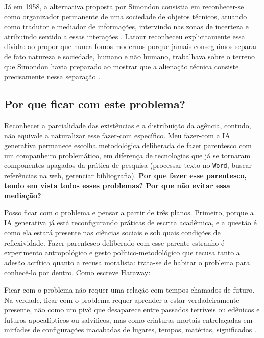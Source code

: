 Já em 1958, a alternativa proposta por Simondon consistia em reconhecer-se como organizador permanente de uma sociedade de objetos técnicos, atuando como tradutor e mediador de informações, intervindo nas zonas de incerteza e atribuindo sentido a essas interações \parencite{Simondon2017OMET}. Latour reconheceu explicitamente essa dívida: ao propor que nunca fomos modernos porque jamais conseguimos separar de fato natureza e sociedade, humano e não humano, trabalhava sobre o terreno que Simondon havia preparado ao mostrar que a alienação técnica consiste precisamente nessa separação \parencite{Latour1994Jamais}.

\subsection{Por que ficar com este problema?}
\label{subsec:parentesco_problema}

Reconhecer a parcialidade das existências e a distribuição da agência, contudo, não equivale a naturalizar esse fazer-com específico. Meu fazer-com a IA generativa permanece escolha metodológica deliberada de fazer parentesco com um companheiro problemático, em diferença de tecnologias que já se tornaram componentes apagados da prática de pesquisa (processar texto no \texttt{Word}, buscar referências na web, gerenciar bibliografia). \textbf{Por que fazer esse parentesco, tendo em vista todos esses problemas? Por que não evitar essa mediação?}

Posso ficar com o problema e pensar a partir de três planos. Primeiro, porque a IA generativa já está reconfigurando práticas de escrita acadêmica, e a questão é como ela estará presente nas ciências sociais e sob quais condições de reflexividade. Fazer parentesco deliberado com esse parente estranho é experimento antropológico e gesto político-metodológico que recusa tanto a adesão acrítica quanto a recusa moralista: trata-se de habitar o problema para conhecê-lo por dentro. Como escreve Haraway:

\begin{citacaoabnt}
Ficar com o problema não requer uma relação com tempos chamados de futuro. Na verdade, ficar com o problema requer aprender a estar verdadeiramente presente, não como um pivô que desaparece entre passados terríveis ou edênicos e futuros apocalípticos ou salvíficos, mas como criaturas mortais entrelaçadas em miríades de configurações inacabadas de lugares, tempos, matérias, significados \parencite[p.~3]{Haraway2023Ficar}.
\end{citacaoabnt}


